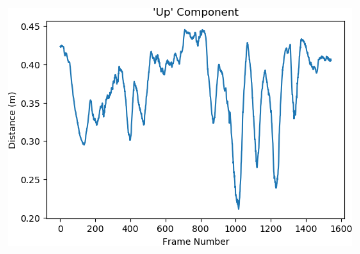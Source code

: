 \begin{figure}
    \centering
        \begin{subfigure}[b]{0.49\textwidth}
         \centering
         \includegraphics[width=\textwidth]{images/bundles.csv_figure_u}
    \end{subfigure}


\end{figure}
